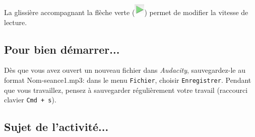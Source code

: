 \begin{itemize}


La glissière accompagnant la flèche verte (\includegraphics[angle=0,width=.4cm]{./images/son01/fleche_verte}) permet de modifier la vitesse de lecture.

\end{itemize}



\subsection{Pour bien démarrer...}

Dès que vous avez ouvert un nouveau fichier dans \emph{Audacity}, sauvegardez-le au format Nom-seance1.mp3: dans le menu \texttt{Fichier}, choisir \texttt{Enregistrer}. Pendant que vous travaillez, pensez à sauvegarder régulièrement votre travail (raccourci clavier \texttt{Cmd + s}).   



\subsection{Sujet de l'activité...}

